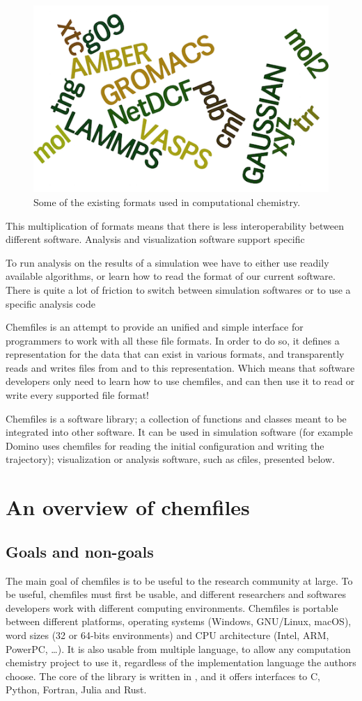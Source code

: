 \documentclass[thesis]{subfiles}
\begin{document}
\begin{figure}[ht]
    \centering
    \includegraphics[width=.4\textwidth]{figures/images/files-formats}
    \caption{Some of the existing formats used in computational chemistry.}
    \label{fig:chemfiles:formats}
\end{figure}

This multiplication of formats means that there is less interoperability between
different software. Analysis and visualization software support specific

To run analysis on the results of a simulation wee have to
either use readily available algorithms, or learn how to read the format of our
current software. There is quite a lot of friction to switch between simulation
softwares or to use a specific analysis code

Chemfiles is an attempt to provide an unified and simple interface for
programmers to work with all these file formats. In order to do so, it defines a
representation for the data that can exist in various formats, and transparently
reads and writes files from and to this representation. Which means that
software developers only need to learn how to use chemfiles, and can then use it
to read or write every supported file format!

Chemfiles is a software library; a collection of functions and classes meant to
be integrated into other software. It can be used in simulation software (for
example Domino uses chemfiles for reading the initial configuration and writing
the trajectory); visualization or analysis software, such as cfiles, presented
below.

\section{An overview of chemfiles}

\subsection{Goals and non-goals}

The main goal of chemfiles is to be useful to the research community at large.
To be useful, chemfiles must first be usable, and different researchers and
softwares developers work with different computing environments. Chemfiles is
portable between different platforms, operating systems (Windows, GNU/Linux,
macOS), word sizes (32 or 64-bits environments) and CPU architecture (Intel,
ARM, PowerPC, \dots). It is also usable from multiple language, to allow any
computation chemistry project to use it, regardless of the implementation
language the authors choose. The core of the library is written in \cxx, and it
offers interfaces to C, Python, Fortran, Julia and Rust.
\end{document}
